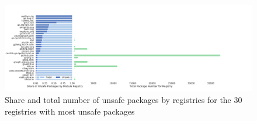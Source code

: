 \begin{figure}[!t]
    \centering
    \includegraphics[width=\textwidth]{assets/plots/chapter4/unsafe-packages-by-registry-n30.pdf}
    \caption{Share and total number of unsafe packages by registries for the 30 registries with most unsafe packages}
    \label{fig:unsafe-packages-by-registry-n30}
\end{figure}
